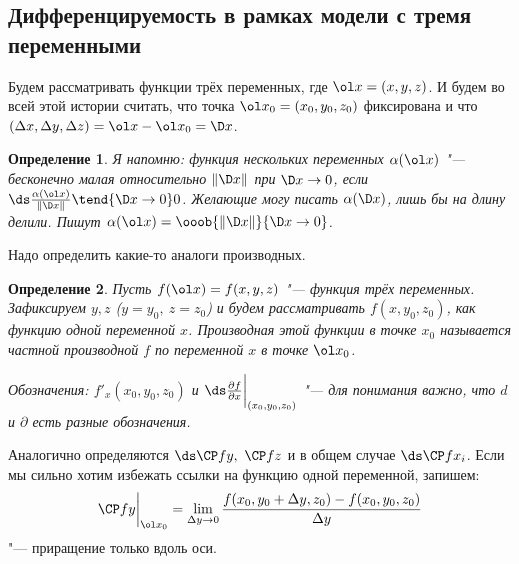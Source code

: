 \documentclass[a4paper,10pt,twoside]{article}
\newtheorem{Def}{Определение}[section]
\begin{document}
	 \subsection{Дифференцируемость в рамках модели с тремя переменными}
	 Будем рассматривать функции трёх переменных, где $\ol x = (x,y,z)$. И будем во всей этой истории считать, что точка $\ol x_0 = (x_0,y_0,z_0)$
	 фиксирована и что $(\Delta x,\Delta y,\Delta z) = \ol x - \ol x_0 = \D x$.
	 \begin{Def}
	 Я напомню: функция нескольких переменных $\alpha(\ol x)$ "--- бесконечно малая относительно $\|\D x\|$ при $\D x\to 0$, если
	 $\ds\frac{\alpha(\ol x)}{\|\D x\|}\tend{\D x\to 0}0$. Желающие могу писать $\alpha(\D x)$, лишь бы на длину делили.
	 Пишут $\alpha(\ol x) = \ooob{\|\D x\|}{\D x \to 0}$.
	 \end{Def} 
	 Надо определить какие-то аналоги производных.
	 \begin{Def}
	 	Пусть $f(\ol x) = f(x,y,z)$ "--- функция трёх переменных. Зафиксируем $y,z$ ($y = y_0,\ z= z_0$) и будем рассматривать $f(x,y_0,z_0)$,
	 	как функцию одной переменной $x$. Производная этой функции в точке $x_0$ называется частной производной $f$ по переменной $x$ в точке $\ol x_0$.
	 	
	 	Обозначения: $f'_x(x_0,y_0,z_0)$ и $\ds\frac{\partial f}{\partial x}\bigg|_{(x_0,y_0,z_0)}$ "--- для понимания важно, что $d$ и $\partial $ есть разные обозначения.
	 \end{Def}
	 Аналогично определяются $\ds\CP fy,\ \CP fz$ и в общем случае $\ds\CP f{x_i}$. Если мы сильно хотим избежать ссылки на функцию одной переменной, запишем:
	 \[\CP fy\bigg|_{\ol x_0} = \lim\limits_{\Delta y\to 0}\frac{f(x_0,y_0 + \Delta y,z_0) - f(x_0,y_0,z_0)}{\Delta y}\]
	 "--- приращение только вдоль оси.
	 
\end{document}
